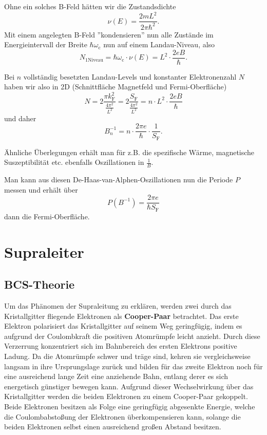 Ohne ein solches B-Feld hätten wir die Zustandsdichte
\begin{equation*}
	\nu(E) = \frac{2mL^2}{2\pi\hbar^2}.
\end{equation*}
Mit einem angelegten B-Feld ''kondensieren'' nun alle Zustände im Energieintervall der Breite $\hbar\omega_\text{c}$ nun auf einem Landau-Niveau, also
\begin{equation*}
	N_\text{1Niveau} = \hbar\omega_\text{c}\cdot\nu(E) = L^2\cdot\frac{2eB}{\hbar}.
\end{equation*}

Bei $n$ vollständig besetzten Landau-Levels und konstanter Elektronenzahl $N$ haben wir also in 2D (Schnittfläche Magnetfeld und Fermi-Oberfläche)
\begin{equation*}
	N = 2\frac{\pi k_\text{F}^2}{\frac{4\pi^2}{L^2}} = 2\frac{S_\text{F}}{\frac{4\pi^2}{L^2}} = n\cdot L^2\cdot\frac{2eB}{\hbar}
\end{equation*}
und daher
\begin{equation*}
	B_n^{-1} = n\cdot\frac{2\pi e}{\hbar}\cdot\frac{1}{S_\text{F}}.
\end{equation*}

Ähnliche Überlegungen erhält man für z.B. die spezifische Wärme, magnetische Suszeptibilität etc. ebenfalls Oszillationen in $\frac{1}{B}$.

Man kann aus diesen De-Haas-van-Alphen-Oszillationen nun die Periode $P$ messen und erhält über
\begin{equation*}
	P(B^{-1}) = \frac{2\pi e}{\hbar S_\text{F}}
\end{equation*}
dann die Fermi-Oberfläche.

\section{Supraleiter}
\subsection{BCS-Theorie}
Um das Phänomen der Supraleitung zu erklären, werden zwei durch das Kristallgitter fliegende Elektronen als \textbf{Cooper-Paar} betrachtet.
Das erste Elektron polarisiert das Kristallgitter auf seinem Weg geringfügig, indem es aufgrund der Coulombkraft die positiven Atomrümpfe leicht anzieht. Durch diese Verzerrung konzentriert
sich im Bahnbereich des ersten Elektrons positive Ladung.
Da die Atomrümpfe schwer und träge sind, kehren sie vergleichsweise langsam in ihre Ursprungslage zurück und bilden für das zweite Elektron noch für eine ausreichend lange Zeit eine anziehende
Bahn, entlang derer es sich energetisch günstiger bewegen kann.
Aufgrund dieser Wechselwirkung über das Kristallgitter werden die beiden Elektronen zu einem Cooper-Paar gekoppelt.
Beide Elektronen besitzen als Folge eine geringfügig abgesenkte Energie, welche die Coulombabstoßung der Elektronen überkompensieren kann, solange die beiden Elektronen selbst einen ausreichend großen Abstand besitzen.

